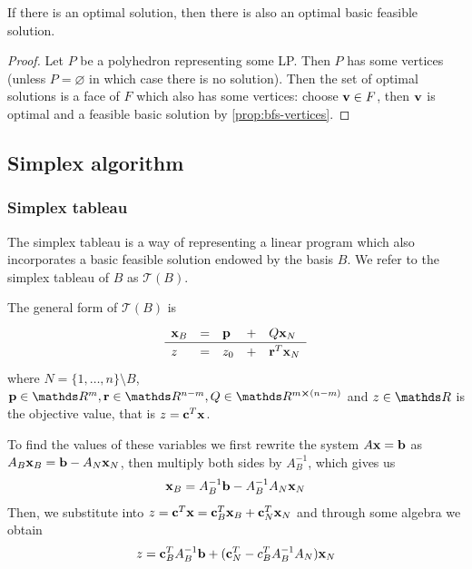 \documentclass[12pt]{extarticle}
\renewcommand{\vec}[1]{\bvec{#1}}
\begin{document}
\begin{corollary}{}{}
	If there is an optimal solution, then there is also an optimal basic feasible solution.
\end{corollary}
\begin{proof}
	Let $P$ be a polyhedron representing some LP. Then $P$ has some vertices (unless $P = \varnothing$
	in which case there is no solution).
	Then the set of optimal solutions is a face of $F$ which also has some vertices:
	choose $\vec v \in F$, then $\vec v$ is optimal and a feasible basic solution by
	\cref{prop:bfs-vertices}.
\end{proof}

\subsection{Simplex algorithm}

\subsubsection{Simplex tableau}

The simplex tableau is a way of representing a linear program which also incorporates a basic
feasible solution endowed by the basis $B$.
We refer to the simplex tableau of $B$ as $\mathcal T(B)$.

The general form of $\mathcal T(B)$ is
\begin{equation}
	\def\arraystretch{1.2}
	\begin{array}{lllll}
		\vec x_B & = & \vec p & + & Q \vec x_N        \\
		\hline
		z        & = & z_0    & + & \vec r^T \vec x_N
	\end{array}
\end{equation}
where $N = \{1, \dots, n\} \setminus B$, $\vec p \in \R^m, \vec r \in \R^{n-m}, Q \in \R^{m
		\cross(n-m)}$ and $z \in \R$ is the objective value, that is $z = \vec c^T \vec x$.

To find the values of these variables we first rewrite the system $A\vec x = \vec b$ as
$A_B \vec x_B = \vec b - A_N \vec x_N$, then multiply both sides by $A_B^{-1}$, which gives us
\begin{equation}
	\vec x_B = A_B^{-1} \vec b - A_B^{-1} A_N \vec x_N
\end{equation}
Then, we substitute into $z = \vec c^T \vec x = \vec c^T_B \vec x_B + \vec c^T_N \vec x_N$
and through some algebra we obtain
\begin{equation}
	z = \vec c^T_B A^{-1}_B \vec b + (\vec c^T_N - c^T_B A_B^{-1} A_N) \vec x_N
\end{equation}
\end{document}
